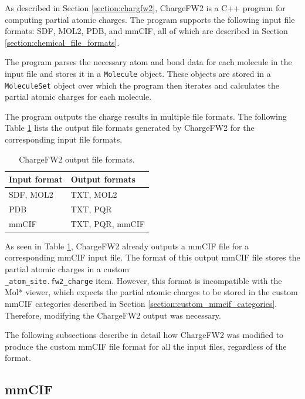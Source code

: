 \documentclass[
  digital,     %
  oneside,     %
  nosansbold,  %
  nocolorbold, %
  lof,         %
  lot,         %
]{fithesis4}
\begin{document}
As described in Section \ref{section:chargfw2}, ChargeFW2 is a C++ program for computing partial atomic charges. The program supports the following input file formats: SDF, MOL2, PDB, and mmCIF, all of which are described in Section \ref{section:chemical_file_formats}.

The program parses the necessary atom and bond data for each molecule in the input file and stores it in a \texttt{Molecule} object. These objects are stored in a \texttt{MoleculeSet} object over which the program then iterates and calculates the partial atomic charges for each molecule.

The program outputs the charge results in multiple file formats. The following Table \ref{table:chargefw2_output_formats} lists the output file formats generated by ChargeFW2 for the corresponding input file formats.

\begin{table}[htbp]
  \centering
  \begin{tabular}{|l|l|}
    \hline
    \textbf{Input format} & \textbf{Output formats} \\
    \hline
    SDF, MOL2 & TXT, MOL2 \\
    \hline
    PDB & TXT, PQR \\
    \hline
    mmCIF & TXT, PQR, mmCIF \\
    \hline
  \end{tabular}
  \caption{ChargeFW2 output file formats.}
  \label{table:chargefw2_output_formats}
\end{table}

As seen in Table \ref{table:chargefw2_output_formats}, ChargeFW2 already outputs a mmCIF file for a corresponding mmCIF input file. The format of this output mmCIF file stores the partial atomic charges in a custom \\
\texttt{\_atom\_site.fw2\_charge} item. However, this format is incompatible with the Mol* viewer, which expects the partial atomic charges to be stored in the custom mmCIF categories described in Section \ref{section:custom_mmcif_categories}. Therefore, modifying the ChargeFW2 output was necessary.

The following subsections describe in detail how ChargeFW2 was modified to produce the custom mmCIF file format for all the input files, regardless of the format.

\subsection{mmCIF}
\end{document}
